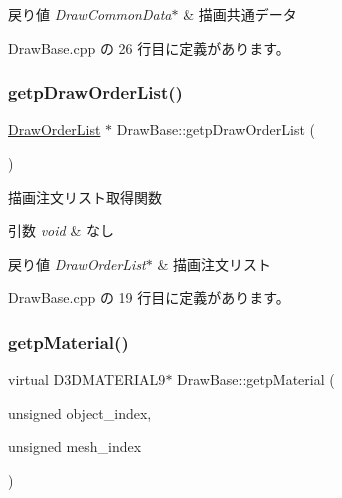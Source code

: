 \begin{DoxyRetVals}{戻り値}
{\em Draw\+Common\+Data$\ast$} & 描画共通データ \\
\hline
\end{DoxyRetVals}


 Draw\+Base.\+cpp の 26 行目に定義があります。

\mbox{\label{class_draw_base_af5fe522d4bbce381e6fe8e5601b69e9f}} 
\subsubsection{\texorpdfstring{getp\+Draw\+Order\+List()}{getpDrawOrderList()}}
{\footnotesize\ttfamily \mbox{\hyperlink{class_draw_order_list}{Draw\+Order\+List}} $\ast$ Draw\+Base\+::getp\+Draw\+Order\+List (\begin{DoxyParamCaption}{ }\end{DoxyParamCaption})}



描画注文リスト取得関数 


\begin{DoxyParams}{引数}
{\em void} & なし \\
\hline
\end{DoxyParams}

\begin{DoxyRetVals}{戻り値}
{\em Draw\+Order\+List$\ast$} & 描画注文リスト \\
\hline
\end{DoxyRetVals}


 Draw\+Base.\+cpp の 19 行目に定義があります。

\mbox{\label{class_draw_base_a940543b482e934624637f3c6b4d17f96}} 
\subsubsection{\texorpdfstring{getp\+Material()}{getpMaterial()}}
{\footnotesize\ttfamily virtual D3\+D\+M\+A\+T\+E\+R\+I\+A\+L9$\ast$ Draw\+Base\+::getp\+Material (\begin{DoxyParamCaption}\item[{unsigned}]{object\+\_\+index,  }\item[{unsigned}]{mesh\+\_\+index }\end{DoxyParamCaption})\hspace{0.3cm}{\ttfamily [pure virtual]}}



